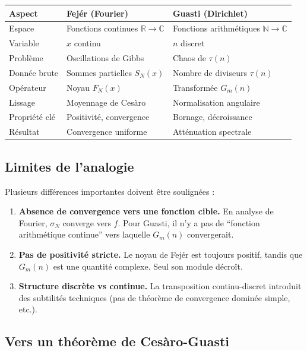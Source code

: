 \documentclass[12pt,a4paper]{article}
\theoremstyle{definition}
\theoremstyle{remark}
\newcommand{\Gm}[2]{G_{#1}(#2)}              %
\newcommand{\N}{\mathbb{N}}
\newcommand{\R}{\mathbb{R}}
\newcommand{\C}{\mathbb{C}}
\begin{document}
\begin{center}
\begin{tabular}{l|l|l}
\textbf{Aspect} & \textbf{Fejér (Fourier)} & \textbf{Guasti (Dirichlet)} \\
\hline
Espace & Fonctions continues $\R \to \C$ & Fonctions arithmétiques $\N \to \C$ \\
Variable & $x$ continu & $n$ discret \\
Problème & Oscillations de Gibbs & Chaos de $\tau(n)$ \\
Donnée brute & Sommes partielles $S_N(x)$ & Nombre de diviseurs $\tau(n)$ \\
Opérateur & Noyau $F_N(x)$ & Transformée $\Gm{m}{n}$ \\
Lissage & Moyennage de Cesàro & Normalisation angulaire \\
Propriété clé & Positivité, convergence & Bornage, décroissance \\
Résultat & Convergence uniforme & Atténuation spectrale
\end{tabular}
\end{center}

\subsection{Limites de l'analogie}

Plusieurs différences importantes doivent être soulignées :

\begin{enumerate}
\item \textbf{Absence de convergence vers une fonction cible.} En analyse de Fourier, $\sigma_N$ converge vers $f$. Pour Guasti, il n'y a pas de ``fonction arithmétique continue'' vers laquelle $\Gm{m}{n}$ convergerait.

\item \textbf{Pas de positivité stricte.} Le noyau de Fejér est toujours positif, tandis que $\Gm{m}{n}$ est une quantité complexe. Seul son module décroît.

\item \textbf{Structure discrète vs continue.} La transposition continu-discret introduit des subtilités techniques (pas de théorème de convergence dominée simple, etc.).
\end{enumerate}

\subsection{Vers un théorème de Cesàro-Guasti}
\end{document}

